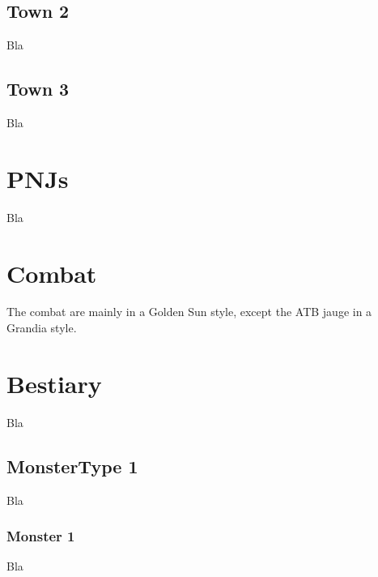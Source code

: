 \documentclass[a4paper,12pt]{book}
\begin{document}
\subsection{Town 2}
Bla
\subsection{Town 3}
Bla
\section{PNJs}
Bla
\section{Combat}
The combat are mainly in a Golden Sun style, except the ATB jauge in a Grandia style.
\section{Bestiary}
Bla
\subsection{MonsterType 1}
Bla
\subsubsection{Monster 1}
Bla
\end{document}
